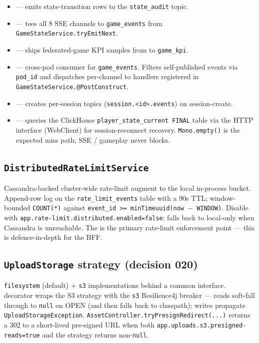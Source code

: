 \begin{itemize}
  \item {} — emits state-transition rows to
        the \texttt{state\_audit} topic.
  \item {} — tees all 8 SSE channels to
        \texttt{game\_events} from \texttt{GameStateService.tryEmitNext}.
  \item {} — ships federated-game KPI samples
        from  to \texttt{game\_kpi}.
  \item {} — cross-pod consumer for
        \texttt{game\_events}. Filters self-published events via
        \texttt{pod\_id} and dispatches per-channel to handlers
        registered in \texttt{GameStateService.@PostConstruct}.
  \item {} — creates per-session topics
        (\texttt{session.<id>.events}) on session-create.
  \item {} — queries the ClickHouse
        \texttt{player\_state\_current FINAL} table via the HTTP
        interface (WebClient) for session-reconnect recovery.
        \texttt{Mono.empty()} is the expected miss path; SSE / gameplay
        never blocks.
\end{itemize}

\subsection{\texttt{DistributedRateLimitService}}
Cassandra-backed cluster-wide rate-limit augment to the local
in-process  bucket. Append-row log on the
\texttt{rate\_limit\_events} table with a 90s TTL; window-bounded
\texttt{COUNT(*)} against
\texttt{event\_id >= minTimeuuid(now $-$ WINDOW)}. Disable with
\texttt{app.rate-limit.distributed.enabled=false}; falls back to
local-only when Cassandra is unreachable. The
 is the primary rate-limit enforcement
point — this is defence-in-depth for the BFF.

\subsection{\texttt{UploadStorage} strategy (decision 020)}
\texttt{filesystem} (default) + \texttt{s3} implementations behind a
common interface.  decorator
wraps the S3 strategy with the \texttt{s3} Resilience4j breaker —
reads soft-fall through to \texttt{null} on OPEN (and
 then falls back to classpath); writes
propagate \texttt{UploadStorageException}.
\texttt{AssetController.tryPresignRedirect(...)} returns a 302 to a
short-lived pre-signed URL when both
\texttt{app.uploads.s3.presigned-reads=true} and the strategy returns
non-\texttt{null}.

